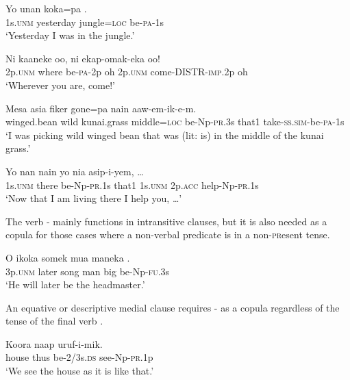 \ea%
\label{ex:3:x263}
\gll Yo unan koka=pa . \\
1s.\textsc{unm} yesterday jungle=\textsc{loc} be-\textsc{pa}-1s \\
\glt`Yesterday I was in the jungle.' 
\z

\ea%
\label{ex:3:x264}
\gll Ni kaaneke  oo, ni ekap-omak-eka oo! \\
2p.\textsc{unm} where be-\textsc{pa}-2p oh 2p.\textsc{unm} come-DISTR-\textsc{imp}.2p oh \\
\glt`Wherever you are, come!'
\z

\ea%
\label{ex:3:x1028}
\gll Mesa asia fiker gone=pa  nain aaw-em-ik-e-m.\\
winged.bean wild kunai.grass middle=\textsc{loc} be-Np-\textsc{pr}.3s that1 take-\textsc{ss}.\textsc{sim}-be-\textsc{pa}-1s\\
\glt`I was picking wild winged bean that was (lit: is) in the middle of the kunai grass.'
\z

\ea%
\label{ex:3:x265}
\gll Yo nan  nain yo nia asip-i-yem, {\dots} \\
1s.\textsc{unm} there be-Np-\textsc{pr}.1s that1 1s.\textsc{unm} 2p.\textsc{acc} help-Np-\textsc{pr}.1s\\
\glt`Now that I am living there I help you, {\dots}'
\z

The verb - mainly functions in intransitive clauses, but it is also needed as a copula for those cases where a non-verbal predicate is in a non-\textsc{pr}esent tense. 

\ea%
\label{ex:3:x969}
\gll O ikoka somek mua maneka . \\
3p.\textsc{unm} later song man big be-Np-\textsc{fu}.3s\\
\glt`He will later be the headmaster.'
\z

An equative or descriptive medial clause requires - as a copula regardless of the tense of the final verb .

\ea%
\label{ex:3:x498}
\gll Koora naap  uruf-i-mik. \\
house thus be-2/3s.\textsc{ds} see-Np-\textsc{pr}.1p\\
\glt`We see the house as it is like that.'
\z

